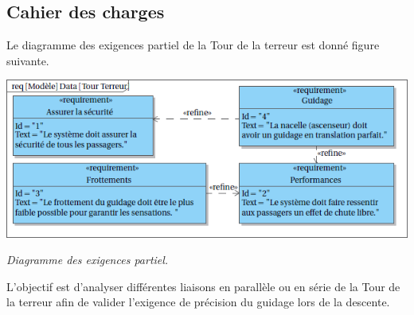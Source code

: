 \documentclass[10pt,fleqn]{article} %
\begin{document}
\begin{multicols}{2}
\begin{multicols}{2}

\subsection*{Cahier des charges\\}

Le diagramme des exigences partiel de la Tour de la terreur est donné figure suivante.


\begin{center}
\includegraphics[width=\linewidth]{images/fig_02}

\textit{Diagramme des exigences partiel.}
\end{center}

%

\begin{obj}
L'objectif est d'analyser différentes liaisons en parallèle ou en série de la Tour de la terreur afin de valider l'exigence de précision du guidage lors de la descente.
\end{obj}





\end{multicols}
\end{multicols}
\end{document}
